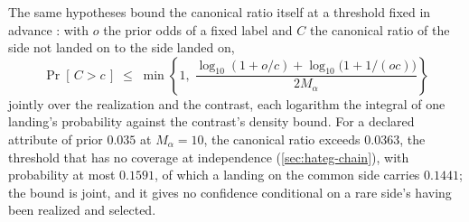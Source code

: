 \documentclass[11pt]{article}
\theoremstyle{definition}
\begin{document}
\noindent The same hypotheses bound the canonical ratio itself at a threshold fixed in advance \cite{Nexus}: with $o$ the prior odds of a fixed label and $C$ the canonical ratio of the side not landed on to the side landed on,
\begin{equation}
\label{eq:strong-fixed-threshold}
\Pr[\, C > c \,] \;\le\; \min\!\left\{1,\; \frac{\log_{10}(1 + o/c) + \log_{10}\big(1 + 1/(oc)\big)}{2M_\alpha}\right\}
\end{equation}
jointly over the realization and the contrast, each logarithm the integral of one landing's probability against the contrast's density bound. For a declared attribute of prior $0.035$ at $M_\alpha = 10$, the canonical ratio exceeds $0.0363$, the threshold that has no coverage at independence (\autoref{sec:hateg-chain}), with probability at most $0.1591$, of which a landing on the common side carries $0.1441$; the bound is joint, and it gives no confidence conditional on a rare side's having been realized and selected.
\end{document}
